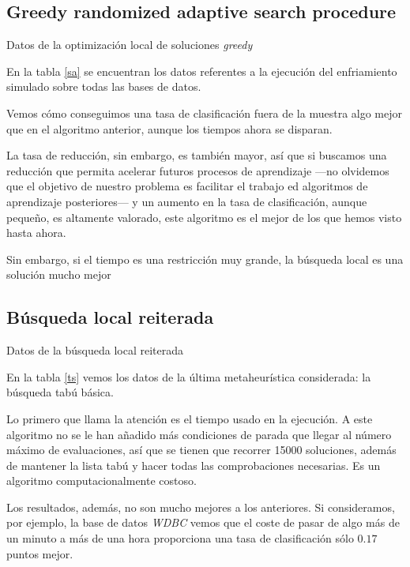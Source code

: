 \documentclass[a4paper, 11pt, titlepage]{article}
\begin{document}
    \subsection{Greedy randomized adaptive search procedure}
    \begin{table}[!htb]
        \maketable{\dataGRASP}
        \caption{Datos de la optimización local de soluciones \emph{greedy}}
        \label{sa}
    \end{table}

    En la tabla \ref{sa} se encuentran los datos referentes a la ejecución del enfriamiento simulado sobre todas las bases de datos.

    Vemos cómo conseguimos una tasa de clasificación fuera de la muestra algo mejor que en el algoritmo anterior, aunque los tiempos ahora se disparan.

    La tasa de reducción, sin embargo, es también mayor, así que si buscamos una reducción que permita acelerar futuros procesos de aprendizaje ---no olvidemos que el objetivo de nuestro problema es facilitar el trabajo ed algoritmos de aprendizaje posteriores--- y un aumento en la tasa de clasificación, aunque pequeño, es altamente valorado, este algoritmo es el mejor de los que hemos visto hasta ahora.

    Sin embargo, si el tiempo es una restricción muy grande, la búsqueda local es una solución mucho mejor

    \subsection{Búsqueda local reiterada}
    \begin{table}[!htb]
        \maketable{\dataILS}
        \caption{Datos de la búsqueda local reiterada}
        \label{ts}
    \end{table}

    En la tabla \ref{ts} vemos los datos de la última metaheurística considerada: la búsqueda tabú básica.

    Lo primero que llama la atención es el tiempo usado en la ejecución. A este algoritmo no se le han añadido más condiciones de parada que llegar al número máximo de evaluaciones, así que se tienen que recorrer 15000 soluciones, además de mantener la lista tabú y hacer todas las comprobaciones necesarias. Es un algoritmo computacionalmente costoso.

    Los resultados, además, no son mucho mejores a los anteriores. Si consideramos, por ejemplo, la base de datos \emph{WDBC} vemos que el coste de pasar de algo más de un minuto a más de una hora proporciona una tasa de clasificación sólo $0.17$ puntos mejor.
\end{document}

